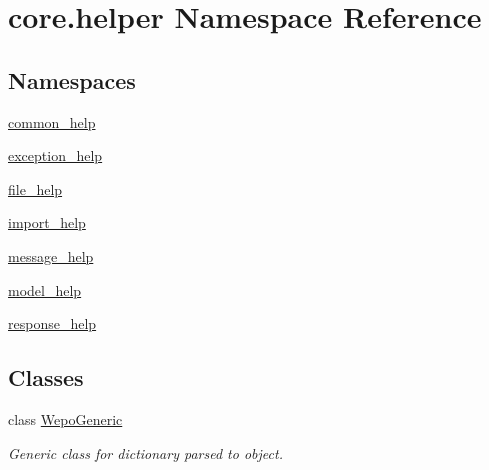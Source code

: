 \hypertarget{namespacecore_1_1helper}{\section{core.\-helper Namespace Reference}
\label{namespacecore_1_1helper}
}
\subsection*{Namespaces}
\begin{DoxyCompactItemize}
\item 
\hyperlink{namespacecore_1_1helper_1_1common__help}{common\-\_\-help}
\item 
\hyperlink{namespacecore_1_1helper_1_1exception__help}{exception\-\_\-help}
\item 
\hyperlink{namespacecore_1_1helper_1_1file__help}{file\-\_\-help}
\item 
\hyperlink{namespacecore_1_1helper_1_1import__help}{import\-\_\-help}
\item 
\hyperlink{namespacecore_1_1helper_1_1message__help}{message\-\_\-help}
\item 
\hyperlink{namespacecore_1_1helper_1_1model__help}{model\-\_\-help}
\item 
\hyperlink{namespacecore_1_1helper_1_1response__help}{response\-\_\-help}
\end{DoxyCompactItemize}
\subsection*{Classes}
\begin{DoxyCompactItemize}
\item 
class \hyperlink{classcore_1_1helper_1_1WepoGeneric}{Wepo\-Generic}
\begin{DoxyCompactList}\small\item\em Generic class for dictionary parsed to object. \end{DoxyCompactList}\end{DoxyCompactItemize}
